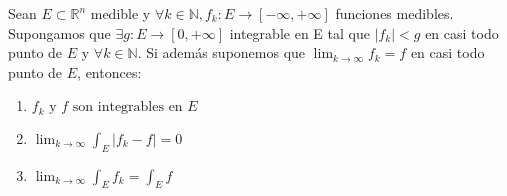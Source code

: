 \begin{teorema} 
    Sean $E \subset \mathbb{R}^n$ medible y $\forall k \in \mathbb{N}, f_k: E \to [-\infty, +\infty]$ funciones medibles. Supongamos que $\exists g: E \to [0, +\infty]$ integrable en E tal que $|f_k| < g$ en casi todo punto de $E$ y $\forall k \in \mathbb{N}$. Si además suponemos que $\lim_{k \to \infty} f_k = f$ en casi todo punto de $E$, entonces:
    \vspace{-0.5em}
    \begin{enumerate}
        \item $f_k \text{ y } f \text{ son integrables en }E$
        \item $\lim_{k \to \infty} \int_{E} |f_k - f| = 0$
        \item $\lim_{k \to \infty} \int_{E} f_k = \int_{E} f$
    \end{enumerate}
\end{teorema}

